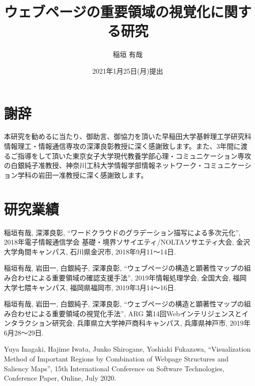 \documentclass[a4j, 12pt]{jsarticle}
\title{ウェブページの重要領域の視覚化に関する研究}
\date{2021年1月25日(月)提出}
\author{稲垣 有哉}
\begin{document}
\pagestyle{empty}
\maketitle

\setcounter{page}{1}
\pagestyle{plain}
\setcounter{tocdepth}{3} %
\tableofcontents

\newpage
{}
\setcounter{page}{1} %
\pagestyle{fancy}









% 

\newpage
\renewcommand{\baselinestretch}{1.5}
\section*{謝辞}
\par 本研究を勧めるに当たり、御助言、御協力を頂いた早稲田大学基幹理工学研究科情報理工・情報通信専攻の深澤良彰教授に深く感謝致します。また、3年間に渡るご指導をして頂いた東京女子大学現代教養学部心理・コミュニケーション専攻の白銀純子准教授、神奈川工科大学情報学部情報ネットワーク・コミュニケーション学科の岩田一准教授に深く感謝致します。

\newpage



\newpage
\section*{研究業績}
\par 稲垣有哉, 深澤良彰, “ワードクラウドのグラデーション描写による多次元化”, 2018年電子情報通信学会 基礎・境界ソサイエティ/NOLTAソサエティ大会, 金沢大学角間キャンパス, 石川県金沢市, 2018年9月11～14日.\\
\par 稲垣有哉, 岩田一, 白銀純子, 深澤良彰, “ウェブページの構造と顕著性マップの組み合わせによる重要領域の確認支援手法”, 2019年情報処理学会, 全国大会, 福岡大学七隈キャンパス, 福岡県福岡市, 2019年3月14～16日.\\
\par 稲垣有哉, 岩田一, 白銀純子, 深澤良彰, “ウェブページの構造と顕著性マップの組み合わせによる重要領域の視覚化手法”, ARG 第14回Webインテリジェンスとインタラクション研究会, 兵庫県立大学神戸商科キャンパス, 兵庫県神戸市, 2019年6月28～29日.\\
\par Yuya Inagaki, Hajime Iwata, Junko Shirogane, Yoshiaki Fukazawa, “Visualization Method of Important Regions by Combination of Webpage Structures and Saliency Maps”, 15th International Conference on Software Technologies, Conference Paper, Online, July 2020.\\


\end{document}
